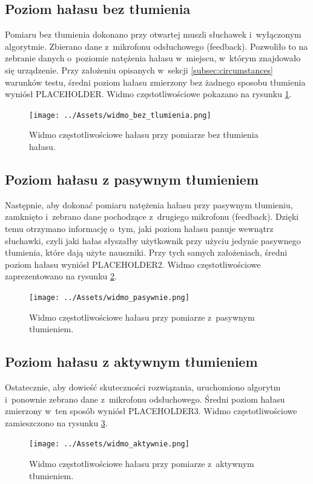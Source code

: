 \subsection{Poziom hałasu bez tłumienia}
Pomiaru bez tłumienia dokonano przy otwartej muszli słuchawek i~wyłączonym algorytmie. Zbierano dane z~mikrofonu odsłuchowego (feedback). Pozwoliło to na zebranie danych o~poziomie natężenia hałasu w~miejscu, w~którym znajdowało się urządzenie. Przy założeniu opisanych w~sekcji \ref{subsec:circumstances} warunków testu, średni poziom hałasu zmierzony bez żadnego sposobu tłumienia wyniósł PLACEHOLDER. %
Widmo częstotliwościowe pokazano na rysunku \ref{fig:widmo_bez}.
\begin{figure}[h!]
	\centering
	\texttt{[image: ../Assets/widmo\_bez\_tlumienia.png]}
	\caption{Widmo częstotliwościowe hałasu przy pomiarze bez tłumienia hałasu.}
	\label{fig:widmo_bez}
\end{figure}

\subsection{Poziom hałasu z pasywnym tłumieniem}
Następnie, aby dokonać pomiaru natężenia hałasu przy pasywnym tłumieniu, zamknięto i~zebrano dane pochodzące z~drugiego mikrofonu (feedback). Dzięki temu otrzymano informację o~tym, jaki poziom hałasu panuje wewnątrz słuchawki, czyli jaki hałas słyszałby użytkownik przy użyciu jedynie pasywnego tłumienia, które dają użyte nauszniki. Przy tych samych założeniach, średni poziom hałasu wyniósł PLACEHOLDER2. %
Widmo częstotliwościowe zaprezentowano na rysunku \ref{fig:widmo_pasywnie}. 
\begin{figure}[h!]
	\centering
	\texttt{[image: ../Assets/widmo\_pasywnie.png]}	
	\caption{Widmo częstotliwościowe hałasu przy pomiarze z~pasywnym tłumieniem.}
	\label{fig:widmo_pasywnie}
\end{figure}

\subsection{Poziom hałasu z aktywnym tłumieniem}
Ostatecznie, aby dowieść skuteczności rozwiązania, uruchomiono algorytm i~ponownie zebrano dane z~mikrofonu odsłuchowego. Średni poziom hałasu zmierzony w~ten sposób wyniósł PLACEHOLDER3. %
Widmo częstotliwościowe zamieszczono na rysunku \ref{fig:widmo_aktywnie}.
\begin{figure}[h!]
	\centering
	\texttt{[image: ../Assets/widmo\_aktywnie.png]}	
	\caption{Widmo częstotliwościowe hałasu przy pomiarze z~aktywnym tłumieniem.}
	\label{fig:widmo_aktywnie}
\end{figure}

